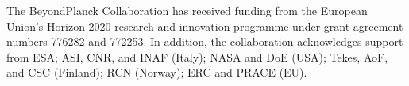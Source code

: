 \begin{acknowledgements}
The BeyondPlanck Collaboration has received funding from the European
Union’s Horizon 2020 research and innovation programme under grant
agreement numbers 776282 and 772253. In addition, the collaboration
acknowledges support from ESA; ASI, CNR, and INAF (Italy); NASA and
DoE (USA); Tekes, AoF, and CSC (Finland); RCN (Norway); ERC and PRACE
(EU).
\end{acknowledgements}

